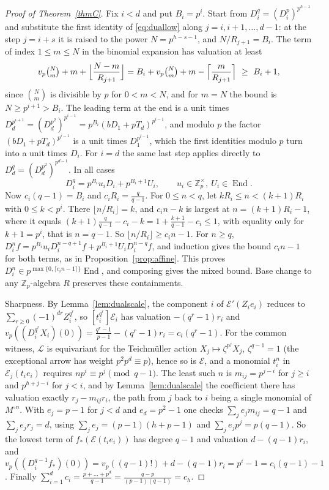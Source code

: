 \documentclass[11pt]{amsart}
\theoremstyle{definition}
\theoremstyle{remark}
\newcommand{\Z}{\mathbb Z}
\newcommand{\vp}{v_p}
\DeclareMathOperator{\End}{End}
\begin{document}
\begin{proof}[Proof of Theorem~\ref{thmC}]
Fix $i<d$ and put $B_i=p^i$. Start from $D_i^q=(D_i^p)^{p^{h-1}}$ and substitute the first identity of \eqref{eq:duallow} along $j=i,i+1,\dots,d-1$: at the step $j=i+s$ it is raised to the power $N=p^{h-s-1}$, and $N/R_{j+1}=B_i$. The term of index $1\le m\le N$ in the binomial expansion has valuation at least
\[
 \vp\tbinom Nm+m+\Bigl\lfloor\frac{N-m}{R_{j+1}}\Bigr\rfloor=B_i+\vp\tbinom Nm+m-\Bigl\lceil\frac m{R_{j+1}}\Bigr\rceil\ \ge\ B_i+1,
\]
since $\binom Nm$ is divisible by $p$ for $0<m<N$, and for $m=N$ the bound is $N\ge p^{i+1}>B_i$. The leading term at the end is a unit times $D_d^{p^{i+1}}=(D_d^{p^2})^{p^{i-1}}=p^{B_i}(bD_1+pT_d)^{p^{i-1}}$, and modulo $p$ the factor $(bD_1+pT_d)^{p^{i-1}}$ is a unit times $D_1^{p^{i-1}}$, which the first identities modulo $p$ turn into a unit times $D_i$. For $i=d$ the same last step applies directly to $D_d^q=(D_d^{p^2})^{p^{d-1}}$. In all cases
\[
 D_i^q=p^{B_i}u_iD_i+p^{B_i+1}U_i,\qquad u_i\in\Z_p^\times,\ U_i\in\End .
\]
Now $c_i(q-1)=B_i$ and $c_iR_i=\frac q{q-1}$. For $0\le n<q$, let $kR_i\le n<(k+1)R_i$ with $0\le k<p^i$. There $\lfloor n/R_i\rfloor=k$, and $c_in-k$ is largest at $n=(k+1)R_i-1$, where it equals $(k+1)\frac q{q-1}-c_i-k=1+\frac{k+1}{q-1}-c_i\le1$, with equality only for $k+1=p^i$, that is $n=q-1$. So $\lfloor n/R_i\rfloor\ge c_in-1$. For $n\ge q$, $D_i^nf=p^{B_i}u_iD_i^{n-q+1}f+p^{B_i+1}U_iD_i^{n-q}f$, and induction gives the bound $c_in-1$ for both terms, as in Proposition~\ref{prop:affine}. This proves $D_i^n\in p^{\max\{0,\lceil c_in-1\rceil\}}\End$, and composing gives the mixed bound. Base change to any $\Z_p$-algebra $R$ preserves these containments.

Sharpness. By Lemma~\ref{lem:dualscale}, the component $i$ of $\mathcal E'(Z_ie_i)$ reduces to $\sum_{r\ge0}(-1)^{dr}Z_i^{q^r}$, so $[t_i^{q^r}]\mathcal E_i$ has valuation $-(q^r-1)r_i$ and $\vp((D_i^{q^r}X_i)(0))=\frac{q^r-1}{p-1}-(q^r-1)r_i=c_i(q^r-1)$. For the common witness, $\mathcal L$ is equivariant for the Teichm\"uller action $X_j\mapsto\zeta^{p^j}X_j$, $\zeta^{q-1}=1$ (the exceptional arrow has weight $p^2p^d\equiv p$), hence so is $\mathcal E$, and a monomial $t_i^n$ in $\mathcal E_j(t_ie_i)$ requires $np^i\equiv p^j\pmod{q-1}$. The least such $n$ is $m_{ij}=p^{j-i}$ for $j\ge i$ and $p^{h+j-i}$ for $j<i$, and by Lemma~\ref{lem:dualscale} the coefficient there has valuation exactly $r_j-m_{ij}r_i$, the path from $j$ back to $i$ being a single monomial of $M^{\circ n}$. With $e_j=p-1$ for $j<d$ and $e_d=p^2-1$ one checks $\sum_je_jm_{ij}=q-1$ and $\sum_je_jr_j=d$, using $\sum_je_j=(p-1)(h+p-1)$ and $\sum_je_jp^j=p(q-1)$. So the lowest term of $f_*(\mathcal E(t_ie_i))$ has degree $q-1$ and valuation $d-(q-1)r_i$, and $\vp((D_i^{q-1}f_*)(0))=\vp((q-1)!)+d-(q-1)r_i=p^i-1=c_i(q-1)-1$. Finally $\sum_{i=1}^dc_i=\frac{p+\dots+p^d}{q-1}=\frac{q-p}{(p-1)(q-1)}=c_h$.
\end{proof}
\end{document}
